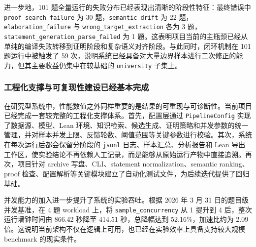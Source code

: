 \documentclass[12pt,a4paper]{ctexart}
\begin{document}
\begin{table}[htbp]
    \centering
    \caption{阶段性基准与消融实验样本级结果汇总}
    \label{tab:benchmark-summary}
\end{table}

进一步地，101 题全量运行的失败分布已经表现出清晰的阶段性特征：最终错误中 \texttt{proof\_search\_failure} 为 30 题，\texttt{semantic\_drift} 为 22 题，\texttt{elaboration\_failure} 与 \texttt{wrong\_target\_extraction} 各为 3 题，\texttt{statement\_generation\_parse\_failed} 为 1 题。这表明项目当前的主瓶颈已经从单纯的编译失败转移到证明阶段和复杂语义对齐阶段。与此同时，闭环机制在 101 题运行中被触发了 59 次，说明系统已经具备对大量边界样本进行二次修正的能力，但其主要收益仍集中在较基础的 \texttt{university} 子集上。

\subsubsection{工程化支撑与可复现性建设已经基本完成}

在研究型系统中，性能数值之外同样重要的是结果的可重现与可诊断性。当前项目已经完成一套较完整的工程化支撑体系。首先，配置层通过 \texttt{PipelineConfig} 实现了数据源、模型、Lean 环境、知识检索、候选生成、证明策略和并发参数的统一管理，并对样本并发上限、反馈轮数、阈值范围等关键参数进行校验。其次，系统在每次运行后都会保留分阶段的 \texttt{jsonl} 日志、样本汇总、分析报告和 Lean 导出工作区，使实验结论不再依赖人工记录，而是能够从原始运行产物中直接追溯。再次，项目针对 archive 写盘、CLI、statement normalization、semantic ranking、proof 检查、配置解析等关键模块建立了自动化测试文件，为后续迭代提供了回归基础。

并发能力的加入进一步提升了系统的实验吞吐。根据 2026 年 3 月 31 日的题目级并发基准，在 4 题 workload 上，将 \texttt{sample\_concurrency} 从 1 提升到 4 后，整次运行墙钟时间由 866.42 秒降至 414.51 秒，总降幅达到 52.16\%，加速比约为 2.09 倍。这说明当前架构不仅在逻辑上可用，也已经在实验效率上具备支持较大规模 benchmark 的现实条件。
\end{document}
